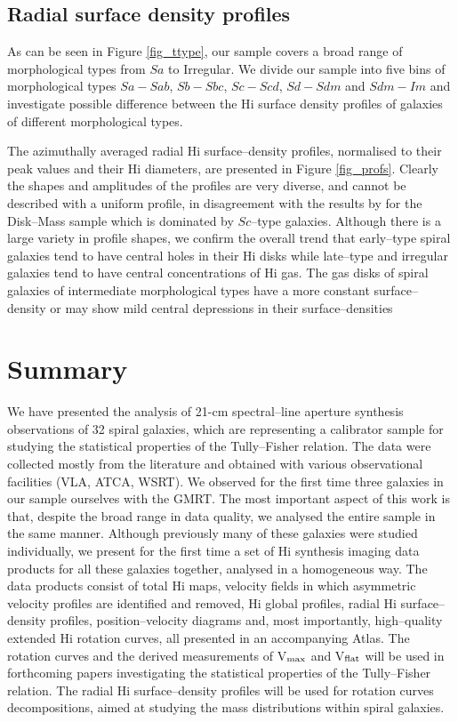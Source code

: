 \documentclass[usenatbib,useAMS]{mnras}
\begin{document}
\subsection{Radial surface density profiles}

 As can be seen in Figure \ref{fig_ttype}, our sample covers a broad
range of morphological types from $Sa$ to Irregular.  We divide our
sample into five bins of morphological types $Sa- Sab$, $Sb-Sbc$,
$Sc-Scd$, $Sd-Sdm$ and $Sdm-Im$ and investigate possible difference
between the H{\sc i} surface density profiles of galaxies of different
morphological types.

The azimuthally averaged radial H{\sc i} surface--density profiles,
normalised to their peak values and their H{\sc i} diameters, are
presented in Figure \ref{fig_profs}.  Clearly the shapes and amplitudes
of the profiles are very diverse, and cannot be described with a uniform
profile, in disagreement with the results by \citet{martinsson11} for
the Disk--Mass sample which is dominated by $Sc$--type galaxies. 
Although there is a large variety in profile shapes, we confirm the
overall trend that early--type spiral galaxies tend to have central
holes in their H{\sc i} disks while late--type and irregular galaxies
tend to have central concentrations of H{\sc i} gas.  The gas disks of
spiral galaxies of intermediate morphological types have a more constant
surface--density or may show mild central depressions in their
surface--densities

 
\section{Summary}

We have presented the analysis of 21-cm spectral--line aperture
synthesis observations of 32 spiral galaxies, which are representing a
calibrator sample for studying the statistical properties of the
Tully--Fisher relation.  The data were collected mostly from the
literature and obtained with various observational facilities (VLA,
ATCA, WSRT).  We observed for the first time three galaxies in our
sample ourselves with the GMRT.  The most important aspect of this work
is that, despite the broad range in data quality, we analysed the entire
sample in the same manner.  Although previously many of these galaxies
were studied individually, we present for the first time a set of
H{\sc i} synthesis imaging data products for all these galaxies
together, analysed in a homogeneous way.  The data products consist of
total H{\sc i} maps, velocity fields in which asymmetric velocity
profiles are identified and removed, H{\sc i} global profiles, radial
H{\sc i} surface--density profiles, position--velocity diagrams and,
most importantly, high--quality extended H{\sc i} rotation curves, all
presented in an accompanying Atlas.  The rotation curves and the derived
measurements of V$_{\rm max}$ and V$_{\rm flat}$ will be used in
forthcoming papers investigating the statistical properties of the
Tully--Fisher relation.  The radial H{\sc i} surface--density profiles
will be used for rotation curves decompositions, aimed at studying the
mass distributions within spiral galaxies. 
\end{document}
